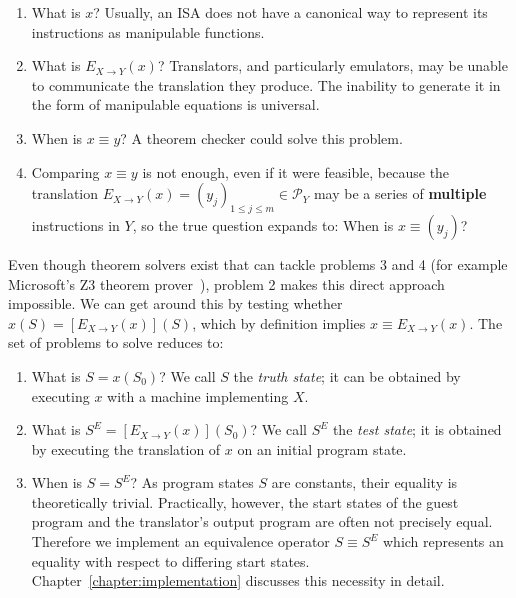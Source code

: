 \begin{enumerate}
    \item What is $x$? Usually, an \ac{ISA} does not have a canonical way to represent its instructions as manipulable
        functions.
    \item What is $E_{X \rightarrow Y}(x)$? Translators, and particularly emulators, may be unable to communicate the
        translation they produce. The inability to generate it in the form of manipulable equations is universal.
    \item When is $x \equiv y$? A theorem checker could solve this problem.
    \item Comparing $x \equiv y$ is not enough, even if it were feasible, because the translation $E_{X \rightarrow
        Y}(x) = (y_j)_{1 \leq j \leq m} \in \mathcal{P}_Y$ may be a series of \textbf{multiple} instructions in $Y$, so
        the true question expands to: When is $x \equiv (y_j)$?
\end{enumerate}

Even though theorem solvers exist that can tackle problems 3 and 4 (for example Microsoft's Z3 theorem
prover~\cite{Z3prover2024Mar}), problem 2 makes this direct approach impossible. We can get around this by testing
whether $x(S) = [E_{X \rightarrow Y}(x)](S)$, which by definition implies $x \equiv E_{X \rightarrow Y}(x)$. The set of
problems to solve reduces to:

\begin{enumerate}
    \item What is $S = x(S_0)$? We call $S$ the \textit{truth state}; it can be obtained by executing $x$ with a machine
        implementing $X$.
    \item What is $S^E = [E_{X \rightarrow Y}(x)](S_0)$? We call $S^E$ the \textit{test state}; it is obtained by
        executing the translation of $x$ on an initial program state.
    \item When is $S = S^E$? As program states $S$ are constants, their equality is theoretically trivial. Practically,
        however, the start states of the guest program and the translator's output program are often not precisely
        equal. Therefore we implement an equivalence operator $S \equiv S^E$ which represents an equality with respect
        to differing start states. Chapter~\ref{chapter:implementation} discusses this necessity in detail.
\end{enumerate}
